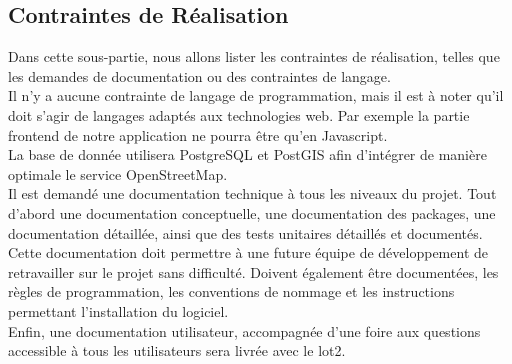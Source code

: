 \subsection{Contraintes de Réalisation}
Dans cette sous-partie, nous allons lister les contraintes de réalisation, telles que les demandes de documentation ou des contraintes de langage.\\

Il n'y a aucune contrainte de langage de programmation, mais il est à noter qu'il doit s'agir de langages adaptés aux technologies web. Par exemple la partie frontend de notre application ne pourra être qu'en Javascript.\\

La base de donnée utilisera PostgreSQL et PostGIS afin d'intégrer de manière optimale le service OpenStreetMap.\\

Il est demandé une documentation technique à tous les niveaux du projet. Tout d'abord une documentation conceptuelle, une documentation des packages, une documentation détaillée, ainsi que des tests unitaires détaillés et documentés. Cette documentation doit permettre à une future équipe de développement de retravailler sur le projet sans difficulté. Doivent également être documentées, les règles de programmation, les conventions de nommage et les instructions permettant l'installation du logiciel.\\

Enfin, une documentation utilisateur, accompagnée d'une foire aux questions accessible à tous les utilisateurs sera livrée avec le lot2.
